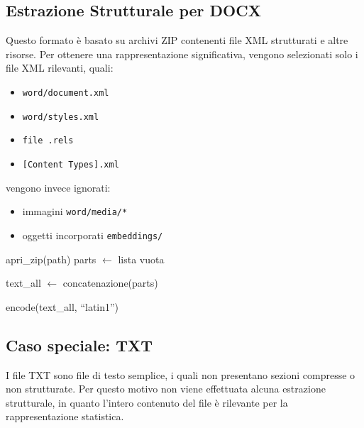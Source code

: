 \documentclass{report}
\begin{document}
\subsection{Estrazione Strutturale per DOCX}

Questo formato è basato su archivi ZIP contenenti file XML strutturati e altre risorse. Per ottenere una rappresentazione significativa,
vengono selezionati solo i file XML rilevanti, quali:
\begin{itemize}
    \item \texttt{word/document.xml}
    \item \texttt{word/styles.xml}
    \item \texttt{file .rels}
    \item \texttt{[Content Types].xml}
\end{itemize}
vengono invece ignorati:
\begin{itemize}
    \item immagini \texttt{word/media/*}
    \item oggetti incorporati \texttt{embeddings/}
\end{itemize}

\begin{algorithm}[H]
\caption{Estrazione strutturale DOCX}

apri\_zip(path)\;
parts $\gets$ lista vuota\;


text\_all $\gets$ concatenazione(parts)\;


\Return encode(text\_all, ``latin1'')\;
\end{algorithm}



\subsection{Caso speciale: TXT}

I file TXT sono file di testo semplice, i quali non presentano sezioni compresse o non strutturate.
Per questo motivo non viene effettuata alcuna estrazione strutturale, in quanto l’intero contenuto del file è rilevante per la rappresentazione statistica.
\end{document}
